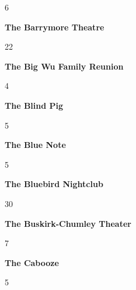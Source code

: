 \begin{center}6\end{center} 
\newline 
\begin{center}\textbf{The Barrymore Theatre}\end{center}
\begin{center}22\end{center} 
\newline 
\begin{center}\textbf{The Big Wu Family Reunion}\end{center}
\begin{center}4\end{center} 
\newline 
\begin{center}\textbf{The Blind Pig}\end{center}
\begin{center}5\end{center} 
\newline 
\begin{center}\textbf{The Blue Note}\end{center}
\begin{center}5\end{center} 
\newline 
\begin{center}\textbf{The Bluebird Nightclub}\end{center}
\begin{center}30\end{center} 
\newline 
\begin{center}\textbf{The Buskirk-Chumley Theater}\end{center}
\begin{center}7\end{center} 
\newline 
\begin{center}\textbf{The Cabooze}\end{center}
\begin{center}5\end{center} 
